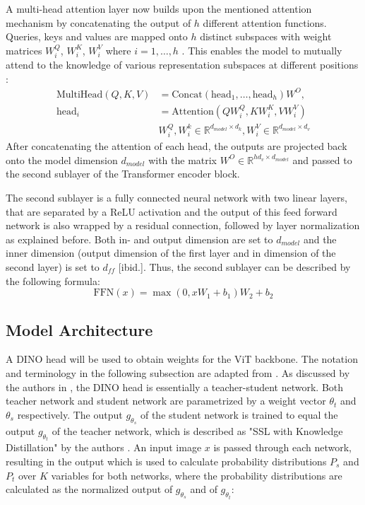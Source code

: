 A multi-head attention layer now builds upon the mentioned attention mechanism by concatenating the output of $h$ different attention functions.
Queries, keys and values are mapped onto $h$ distinct subspaces with weight matrices $W_i^Q$, $W_i^K$, $W_i^V$ where $i=1,\dots,h$ \citep{Vaswani2017}.
This enables the model to mutually attend to the knowledge of various representation subspaces at different positions \citep{Vaswani2017}:
\begin{align}
	\text{MultiHead}(Q,K,V) &= \text{Concat}(\text{head}_1,\dots,\text{head}_h)W^O, \\
	\text{head}_i & = \text{Attention}(QW_i^Q,KW_i^K,VW_i^V) \\
	& W_{i}^{Q}, W_{i}^{k} \in \mathbb{R}^{d_{model}\times d_k} , W_i^V \in \mathbb{R}^{d_{model} \times d_v}	
\end{align}
After concatenating the attention of each head, the outputs are projected back onto the model dimension $d_{model}$ with the matrix $W^O \in \mathbb{R}^{hd_v \times d_{model}}$ and passed to the second sublayer of the Transformer encoder block.
\par
The second sublayer is a fully connected neural network with two linear layers, that are separated by a ReLU activation \citep{Vaswani2017} and the output of this feed forward network is also wrapped by a residual connection, followed by layer normalization as explained before.
Both in- and output dimension are set to $d_{model}$ and the inner dimension (output dimension of the first layer and in dimension of the second layer) is set to $d_{ff}$ [ibid.].
Thus, the second sublayer can be described by the following formula:
\begin{equation}
	\text{FFN}(x) = \max(0, xW_1 + b_1)W_2+b_2 
\end{equation}
\subsection{Model Architecture}
A DINO head will be used to obtain weights for the ViT backbone.
The notation and terminology in the following subsection are adapted from \citep{Caron2021}.
As discussed by the authors in \citep{Caron2021}, the DINO head is essentially a teacher-student network.
Both teacher network and student network are parametrized by a weight vector $\theta_t$ and $\theta_s$ respectively.
The output $g_{\theta_s}$ of the student network is trained to equal the output $g_{\theta_t}$ of the teacher network, which is described as "SSL with Knowledge Distillation" by the authors \citep{Caron2021}.
An input image $x$ is passed through each network, resulting in the output which is used to calculate probability distributions $P_s$ and $P_t$ over $K$ variables for both networks, where the probability distributions are calculated as the normalized output of $g_{\theta_s}$ and of $g_{\theta_t}$:

